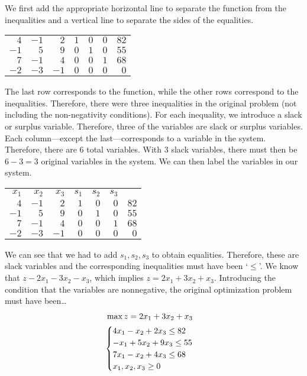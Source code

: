 \documentclass[11pt,letterpaper]{article}
\begin{document}
\sol We first add the appropriate horizontal line to separate the function from the inequalities and a vertical line to separate the sides of the equalities. \par
	\begin{table}[H]
	\centering
	\begin{tabular}{rrrrrr|r}
	$4$ & $-1$ & $2$ & $1$ & $0$ & $0$ & $82$ \\
	$-1$ & $5$ & $9$ & $0$ & $1$ & $0$ & $55$ \\
	$7$ & $-1$ & $4$ & $0$ & $0$ & $1$ & $68$ \\ \hline
	$-2$ & $-3$ & $-1$ & $0$ & $0$ & $0$ & $0$ 
	\end{tabular}
	\end{table}  \par
The last row corresponds to the function, while the other rows correspond to the inequalities. Therefore, there were three inequalities in the original problem (not including the non-negativity conditions). For each inequality, we introduce a slack or surplus variable. Therefore, three of the variables are slack or surplus variables. Each column---except the last---corresponds to a variable in the system. Therefore, there are 6 total variables. With 3 slack variables, there must then be $6 - 3= 3$ original variables in the system. We can then label the variables in our system. \par
	\begin{table}[H]
	\centering
	\begin{tabular}{rrrrrrr}
	{\footnotesize$x_1$} & {\footnotesize$x_2$} & {\footnotesize$x_3$} & {\footnotesize$s_1$} & {\footnotesize$s_2$} & {\footnotesize$s_3$} & \\
	$4$ & $-1$ & $2$ & $1$ & $0$ & \multicolumn{1}{r|}{$0$} & $82$ \\
	$-1$ & $5$ & $9$ & $0$ & $1$ & \multicolumn{1}{r|}{$0$} & $55$ \\
	$7$ & $-1$ & $4$ & $0$ & $0$ & \multicolumn{1}{r|}{$1$} & $68$ \\ \hline
	$-2$ & $-3$ & $-1$ & $0$ & $0$ & \multicolumn{1}{r|}{$0$} & $0$ 
	\end{tabular}
	\end{table} \par
We can see that we had to add $s_1, s_2, s_3$ to obtain equalities. Therefore, these are slack variables and the corresponding inequalities must have been `$\leq$'. We know that $z - 2x_1 - 3x_2 - x_3$, which implies $z= 2x_1 + 3x_2 + x_3$. Introducing the condition that the variables are nonnegative, the original optimization problem must have been\dots
	\[
	\begin{gathered}
	\hspace{-0.3cm} \max z= 2x_1 + 3x_2 + x_3 \\
	\begin{cases}
	4x_1 - x_2 + 2x_3 \leq 82 \\
	-x_1 + 5x_2 + 9x_3 \leq 55 \\
	7x_1 - x_2 + 4x_3 \leq 68 \\
	x_1, x_2, x_3 \geq 0
	\end{cases}
	\end{gathered}
	\] 
\end{document}
